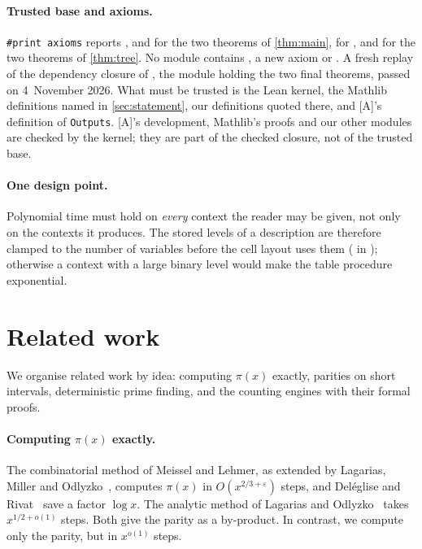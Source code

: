 \documentclass[10pt]{amsart}
\theoremstyle{plain}
\theoremstyle{definition}
\theoremstyle{remark}
\numberwithin{equation}{section}
\newcommand{\A}{\textup{[A]}}
\begin{document}
\paragraph{Trusted base and axioms.} \texttt{\#print axioms} reports ,
 and  for the two theorems of \cref{thm:main}, for
, and for the two theorems of \cref{thm:tree}. No module contains
, a new axiom or .
A fresh  replay of the dependency closure of , the
module holding the two final theorems, passed on 4~November 2026.
What must be trusted is the Lean kernel, the Mathlib definitions named in \cref{sec:statement}, our
definitions quoted there, and \A's definition of \texttt{Outputs}. \A's development, Mathlib's proofs and
our other modules are checked by the kernel; they are part of the checked closure, not of the trusted
base.

\paragraph{One design point.} Polynomial time must hold on \emph{every} context the reader may be given,
not only on the contexts it produces. The stored levels of a description are therefore clamped to the
number of variables before the cell layout uses them ( in ); otherwise a
context with a large binary level would make the table procedure exponential.

\section{Related work}\label{sec:related}

We organise related work by idea: computing $\pi(x)$ exactly, parities on short intervals, deterministic
prime finding, and the counting engines with their formal proofs.

\paragraph{Computing $\pi(x)$ exactly.} The combinatorial method of Meissel and Lehmer, as extended by
Lagarias, Miller and Odlyzko~\cite{LMO85}, computes $\pi(x)$ in $O(x^{2/3+\varepsilon})$ steps, and
Del\'eglise and Rivat~\cite{DR96} save a factor $\log x$. The analytic method of Lagarias and
Odlyzko~\cite{LO87} takes $x^{1/2+o(1)}$ steps. Both give the parity as a by-product. In contrast, we
compute only the parity, but in $x^{o(1)}$ steps.
\end{document}
